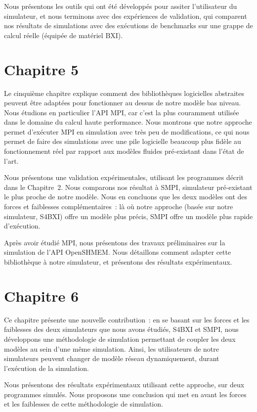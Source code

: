 Nous présentons les outils qui ont été développés pour assiter l'utilisateur du
simulateur, et nous terminons avec des expériences de validation, qui comparent
nos résultats de simulations avec des exécutions de benchmarks sur une grappe de
calcul réelle (équipée de matériel BXI).

\section*{Chapitre 5}

Le cinquième chapitre explique comment des bibliothèques logicielles abstraites
peuvent être adaptées pour fonctionner au dessus de notre modèle bas niveau.
Nous étudions en particulier l'API MPI, car c'est la plus couramment utilisée
dans le domaine du calcul haute performance. Nous montrons que notre approche
permet d'exécuter MPI en simulation avec très peu de modifications, ce qui nous
permet de faire des simulations avec une pile logicielle beaucoup plus fidèle au
fonctionnement réel par rapport aux modèles fluides pré-existant dans l'état de
l'art.

Nous présentons une validation expérimentales, utilisant les programmes décrit
dans le Chapitre~2. Nous comparons nos résultat à SMPI, simulateur pré-existant
le plus proche de notre modèle. Nous en concluons que les deux modèles ont des
forces et faiblesses complémentaires~: là où notre approche (basée sur notre
simulateur, S4BXI) offre un modèle plus précis, SMPI offre un modèle plus rapide
d'exécution.

Après avoir étudié MPI, nous présentons des travaux préliminaires sur la
simulation de l'API OpenSHMEM. Nous détaillons comment adapter cette
bibliothèque à notre simulateur, et présentons des résultats expérimentaux.

\section*{Chapitre 6}

Ce chapitre présente une nouvelle contribution~: en se basant sur les forces et
les faiblesses des deux simulateurs que nous avons étudiés, S4BXI et SMPI, nous
développons une méthodologie de simulation permettant de coupler les deux
modèles au sein d'une même simulation. Ainsi, les utilisateurs de notre
simulateurs peuvent changer de modèle réseau dynamiquement, durant l'exécution
de la simulation.

Nous présentons des résultats expérimentaux utilisant cette approche, sur deux
programmes simulés. Nous proposons une conclusion qui met en avant les forces et
les faiblesses de cette méthodologie de simulation.


